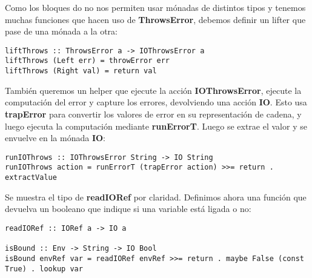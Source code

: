 Como los bloques do no nos permiten usar m\'onadas de distintos tipos y tenemos muchas funciones que hacen uso de \textbf{ThrowsError}, debemos definir un lifter que pase de una m\'onada a la otra:\\

\begin{minipage}{\linewidth}
\begin{footnotesize}
\begin{lstlisting}[frame=single]
liftThrows :: ThrowsError a -> IOThrowsError a
liftThrows (Left err) = throwError err
liftThrows (Right val) = return val
\end{lstlisting}
\end{footnotesize}
\end{minipage}

Tambi\'en queremos un helper que ejecute la acci\'on \textbf{IOThrowsError}, ejecute la computaci\'on del error y capture los errores, devolviendo una acci\'on \textbf{IO}. Esto usa \textbf{trapError} para convertir los valores de error en su representaci\'on de cadena, y luego ejecuta la computaci\'on mediante \textbf{runErrorT}. Luego se extrae el valor y se envuelve en la m\'onada \textbf{IO}:\\

\begin{minipage}{\linewidth}
\begin{scriptsize}
\begin{lstlisting}[frame=single]
runIOThrows :: IOThrowsError String -> IO String
runIOThrows action = runErrorT (trapError action) >>= return . extractValue
\end{lstlisting}
\end{scriptsize}
\end{minipage}

Se muestra el tipo de \textbf{readIORef} por claridad. Definimos ahora una funci\'on que devuelva un booleano que indique si una variable est\'a ligada o no:\\

\begin{minipage}{\linewidth}
\begin{tiny}
\begin{lstlisting}[frame=single]
readIORef :: IORef a -> IO a

isBound :: Env -> String -> IO Bool
isBound envRef var = readIORef envRef >>= return . maybe False (const True) . lookup var
\end{lstlisting}
\end{tiny}
\end{minipage}

